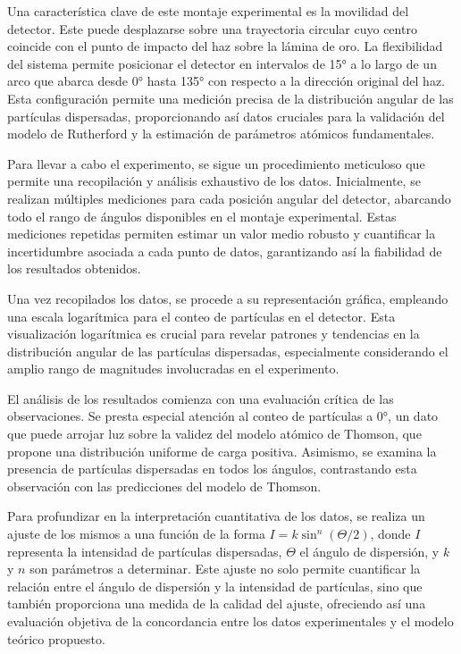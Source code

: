 \documentclass[twocolumn,a4paper,11pt]{scrartcl}
\begin{document}
Una característica clave de este montaje experimental es la movilidad del detector. Este puede desplazarse sobre una trayectoria circular cuyo centro coincide con el punto de impacto del haz sobre la lámina de oro. La flexibilidad del sistema permite posicionar el detector en intervalos de 15° a lo largo de un arco que abarca desde 0° hasta 135° con respecto a la dirección original del haz. Esta configuración permite una medición precisa de la distribución angular de las partículas dispersadas, proporcionando así datos cruciales para la validación del modelo de Rutherford y la estimación de parámetros atómicos fundamentales.

Para llevar a cabo el experimento, se sigue un procedimiento meticuloso que permite una recopilación y análisis exhaustivo de los datos. Inicialmente, se realizan múltiples mediciones para cada posición angular del detector, abarcando todo el rango de ángulos disponibles en el montaje experimental. Estas mediciones repetidas permiten estimar un valor medio robusto y cuantificar la incertidumbre asociada a cada punto de datos, garantizando así la fiabilidad de los resultados obtenidos.

Una vez recopilados los datos, se procede a su representación gráfica, empleando una escala logarítmica para el conteo de partículas en el detector. Esta visualización logarítmica es crucial para revelar patrones y tendencias en la distribución angular de las partículas dispersadas, especialmente considerando el amplio rango de magnitudes involucradas en el experimento.

El análisis de los resultados comienza con una evaluación crítica de las observaciones. Se presta especial atención al conteo de partículas a 0°, un dato que puede arrojar luz sobre la validez del modelo atómico de Thomson, que propone una distribución uniforme de carga positiva. Asimismo, se examina la presencia de partículas dispersadas en todos los ángulos, contrastando esta observación con las predicciones del modelo de Thomson.

Para profundizar en la interpretación cuantitativa de los datos, se realiza un ajuste de los mismos a una función de la forma $I = k \sin^n (\Theta/2)$, donde $I$ representa la intensidad de partículas dispersadas, $\Theta$ el ángulo de dispersión, y $k$ y $n$ son parámetros a determinar. Este ajuste no solo permite cuantificar la relación entre el ángulo de dispersión y la intensidad de partículas, sino que también proporciona una medida de la calidad del ajuste, ofreciendo así una evaluación objetiva de la concordancia entre los datos experimentales y el modelo teórico propuesto.
\end{document}

